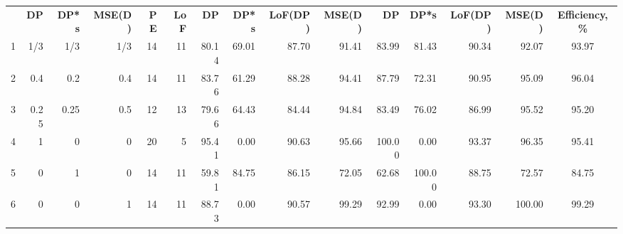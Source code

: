 \begin{table}[h]
{\begin{tabular}{rrrrrrrrrrrrrrc}
    & \textbf{DP}       & \textbf{DP*s}    & \textbf{MSE(D)}   & \textbf{PE}   & \textbf{LoF}        & \textbf{DP} & \textbf{DP*s}  & \textbf{LoF(DP)}   & \textbf{MSE(D)}  &  \textbf{DP} & \textbf{DP*s} & \textbf{LoF(DP)}   & \textbf{MSE(D)} & \textbf{Efficiency,\%} \\
1 & 1/3 & 1/3 & 1/3 & \multicolumn{1}{|r}{14} & \multicolumn{1}{r|}{11} & 80.14 & 69.01 & 87.70 & 91.41 & \multicolumn{1}{|r}{83.99} & 81.43 & 90.34 & \multicolumn{1}{r|}{92.07} & 93.97\\
2 & 0.4 & 0.2 & 0.4 & \multicolumn{1}{|r}{14} & \multicolumn{1}{r|}{11} & 83.76 & 61.29 & 88.28 & 94.41 & \multicolumn{1}{|r}{87.79} & 72.31 & 90.95 & \multicolumn{1}{r|}{95.09} & 96.04\\
3 & 0.25 & 0.25 & 0.5 & \multicolumn{1}{|r}{12} & \multicolumn{1}{r|}{13} & 79.66 & 64.43 & 84.44 & 94.84 & \multicolumn{1}{|r}{83.49} & 76.02 & 86.99 & \multicolumn{1}{r|}{95.52} & 95.20\\
4 & 1 & 0 & 0 & \multicolumn{1}{|r}{20} & \multicolumn{1}{r|}{5} & 95.41 & 0.00 & 90.63 & 95.66 & \multicolumn{1}{|r}{100.00} & 0.00 & 93.37 & \multicolumn{1}{r|}{96.35} &  95.41\\
5 & 0 & 1 & 0 & \multicolumn{1}{|r}{14} & \multicolumn{1}{r|}{11} & 59.81 & 84.75 & 86.15 & 72.05 & \multicolumn{1}{|r}{62.68} & 100.00 & 88.75 & \multicolumn{1}{r|}{72.57} & 84.75 \\
6 & 0 & 0 & 1 & \multicolumn{1}{|r}{14} & \multicolumn{1}{r|}{11} & 88.73 & 0.00 & 90.57 & 99.29 & \multicolumn{1}{|r}{92.99} & 0.00 & 93.30 & \multicolumn{1}{r|}{100.00} & 99.29
\end{tabular}
}
\end{table}

